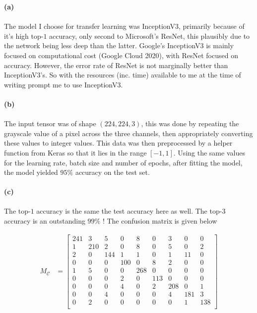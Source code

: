 \begin{homeworkProblem}
  \textbf{(a)}
  \\
  \\

  The model I choose for transfer learning was InceptionV3, primarily because of
  it's high top-$1$ accuracy, only second to Microsoft's ResNet, this plausibly due to the
  network being less deep than the latter. Google's InceptionV3 is mainly focused on
  computational cost (Google Cloud 2020), with ResNet focused on accuracy. However,
  the error rate of ResNet is not marginally better than InceptionV3's.
  So with the resources (inc. time) available to me at the time of writing prompt
  me to use InceptionV3. \\ \\

  \textbf{(b)}
  \\
  \\

  The input tensor was of shape $(224,224, 3)$, this was done by repeating the
  grayscale value of a pixel across the three channels, then appropriately
  converting these values to integer values. This data was then preprocessed by
  a helper function from Keras so that it lies in the range $[-1,1]$. Using the
  same values for the learning rate, batch size and number of epochs, after
  fitting the model, the model yielded $95\%$ accuracy on the test set. \\ \\


  \textbf{(c)}
  \\
  \\
  The top-$1$ accuracy is the same the test accuracy here as well. The top-$3$
  accuracy is an outstanding $99\%$ ! The confusion matrix is given below

  \begin{align}
    M_\mathcal{C} &= \begin{bmatrix}
      241 & 3 & 5 & 0 & 8 & 0 & 3 & 0 & 0\\
      1 & 210 & 2 & 0 & 8 & 0 & 5 & 0 & 2\\
      2 & 0 & 144 & 1 & 1 & 0 & 1 & 11 & 0\\
      0 & 0 & 0 & 100 & 0 & 8 & 2 & 0 & 0\\
      1 & 5 & 0 & 0 & 268 & 0 & 0 & 0 & 0\\
      0 & 0 & 0 & 2 & 0 & 113 & 0 & 0 & 0\\
      0 & 0 & 0 & 4 & 0 & 2 & 208 & 0 & 1\\
      0 & 0 & 4 & 0 & 0 & 0 & 4 & 181 & 3\\
      0 & 2 & 0 & 0 & 0 & 0 & 0 & 1 & 138\\
    \end{bmatrix}
  \end{align}


\end{homeworkProblem}

